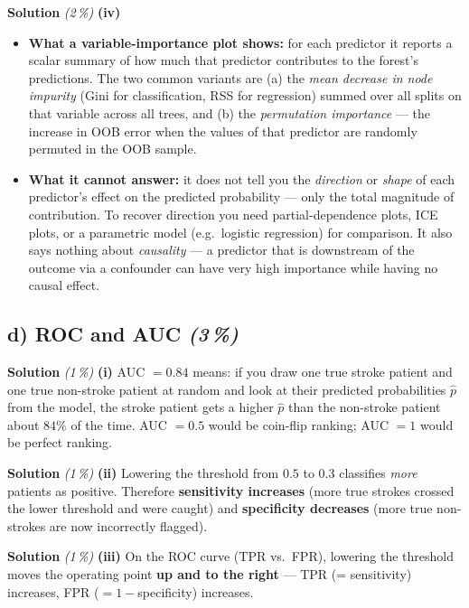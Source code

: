 \documentclass[11pt,a4paper]{article}
\newcommand{\subpoints}[1]{\textit{(#1\,\%)}}
\newcommand{\sol}{\noindent\textbf{Solution}}
\begin{document}
\medskip
\sol{} \subpoints{2} \textbf{(iv)}
\begin{itemize}
  \item \textbf{What a variable-importance plot shows:} for each predictor it reports a scalar
        summary of how much that predictor contributes to the forest's predictions. The two
        common variants are (a) the \emph{mean decrease in node impurity} (Gini for
        classification, RSS for regression) summed over all splits on that variable across all
        trees, and (b) the \emph{permutation importance} --- the increase in OOB error when the
        values of that predictor are randomly permuted in the OOB sample.
  \item \textbf{What it cannot answer:} it does not tell you the \emph{direction} or
        \emph{shape} of each predictor's effect on the predicted probability --- only the total
        magnitude of contribution. To recover direction you need partial-dependence plots, ICE
        plots, or a parametric model (e.g.\ logistic regression) for comparison. It also says
        nothing about \emph{causality} --- a predictor that is downstream of the outcome via a
        confounder can have very high importance while having no causal effect.
\end{itemize}

\subsection*{d) ROC and AUC \subpoints{3}}

\sol{} \subpoints{1} \textbf{(i)} AUC $= 0.84$ means: if you draw one true stroke patient and
one true non-stroke patient at random and look at their predicted probabilities $\hat p$ from the
model, the stroke patient gets a higher $\hat p$ than the non-stroke patient about $84\%$ of the
time. AUC $= 0.5$ would be coin-flip ranking; AUC $= 1$ would be perfect ranking.

\medskip
\sol{} \subpoints{1} \textbf{(ii)} Lowering the threshold from $0.5$ to $0.3$ classifies
\emph{more} patients as positive. Therefore \textbf{sensitivity increases} (more true strokes
crossed the lower threshold and were caught) and \textbf{specificity decreases} (more true
non-strokes are now incorrectly flagged).

\medskip
\sol{} \subpoints{1} \textbf{(iii)} On the ROC curve (TPR vs.\ FPR), lowering the threshold
moves the operating point \textbf{up and to the right} --- TPR (= sensitivity) increases,
FPR ($= 1-$specificity) increases.
\end{document}
